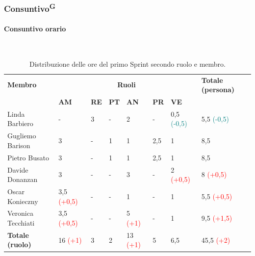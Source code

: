 \documentclass[8pt]{article}
\newcommand{\glossterm}[1]{#1\textsuperscript{G}} %
\newcommand{\subsubsubsection}[1]{\paragraph{#1}\mbox{}\\}
\begin{document}
\subsubsection{\glossterm{Consuntivo}}
\subsubsubsection{Consuntivo orario}
\begin{table}[ht!]
	\centering
    \begin{tabular}{p{4cm}*{6}{l}p{3cm}}
		\toprule
        \textbf{Membro} & \multicolumn{6}{c}{\textbf{Ruoli}} & \textbf{Totale
        (persona)}\\
		& \textbf{AM} & \textbf{RE} & \textbf{PT} & \textbf{AN} & \textbf{PR} & \textbf{VE}\\
		\midrule
        Linda Barbiero & - & 3 & - & 2 & - & 0,5 \textcolor{teal}{(-0,5)} & 5,5 \textcolor{teal}{(-0,5)} \\ 
        Gugliemo Barison & 3 & - & 1 & 1 & 2,5 & 1 & 8,5 \\ 
        Pietro Busato & 3 & - & 1 & 1 & 2,5 & 1 & 8,5 \\ 
        Davide Donanzan & 3 & - & - & 3 & - & 2 \textcolor{red}{(+0,5)} & 8 \textcolor{red}{(+0,5)} \\ 
        Oscar Konieczny & 3,5 \textcolor{red}{(+0,5)} & - & - & 1 & - & 1 & 5,5 \textcolor{red}{(+0,5)} \\ 
        Veronica Tecchiati & 3,5 \textcolor{red}{(+0,5)} & - & - & 5 \textcolor{red}{(+1)} & - & 1 & 9,5 \textcolor{red}{(+1,5)} \\ 
        \bottomrule
        \textbf{Totale (ruolo)} & 16 \textcolor{red}{(+1)} & 3 & 2 & 13 \textcolor{red}{(+1)} & 5 & 6,5 & 45,5 \textcolor{red}{(+2)} \\
	\end{tabular}
	\caption{Distribuzione delle ore del primo Sprint secondo ruolo e membro.}
	\label{table:Distribuzione delle ore consuntive del primo Sprint secondo ruolo e membro}
\end{table}
\end{document}
